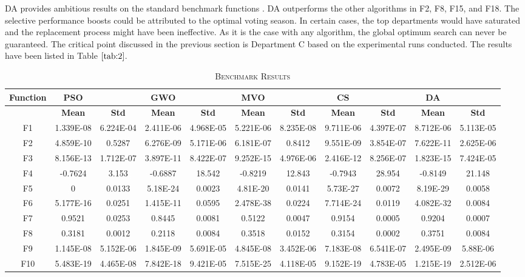 \documentclass[conference]{IEEEtran}
\begin{document}
DA provides ambitious results on the standard benchmark functions \cite{bf}. DA outperforms the other algorithms in F2, F8, F15, and F18. The selective performance boosts could be attributed to the optimal voting season. In certain cases, the top departments would have saturated and the replacement process might have been ineffective. As it is the case with any algorithm, the global optimum search can never be guaranteed. The critical point discussed in the previous section is Department C based on the experimental runs conducted. The results have been listed in Table $\ref{tab:2}$.

\begin{table}
\scriptsize
\caption{\textsc{Benchmark Results}}
\label{tab:2}
\centering
{
\begin{tabular}{| c | c  c | c  c | c  c | c  c | c  c |}
\hline
{\textbf{Function}}&{\textbf{PSO}}&{}&{\textbf{GWO}}&{}&{\textbf{MVO}}&{}&{\textbf{CS}}&{}&{\textbf{DA}}&{}\\
\hline
{}&{\textbf{Mean}}&{\textbf{Std}}&{\textbf{Mean}}&{\textbf{Std}}&{\textbf{Mean}}&{\textbf{Std}}&{\textbf{Mean}}&{\textbf{Std}}&{\textbf{Mean}}&{\textbf{Std}}\\
\hline
{F1}&{1.339E-08}&{6.224E-04}&{2.411E-06}&{4.968E-05}&{5.221E-06}&{8.235E-08}&{9.711E-06}&{4.397E-07}&{8.712E-06}&{5.113E-05}\\
{F2}&{4.859E-10}&{0.5287}&{6.276E-09}&{5.171E-06}&{6.181E-07}&{0.8412}&{9.551E-09}&{3.854E-07}&{7.622E-11}&{2.625E-06}\\
{F3}&{8.156E-13}&{1.712E-07}&{3.897E-11}&{8.422E-07}&{9.252E-15}&{4.976E-06}&{2.416E-12}&{8.256E-07}&{1.823E-15}&{7.424E-05}\\
{F4}&{-0.7624}&{3.153}&{-0.6887}&{18.542}&{-0.8219}&{12.843}&{-0.7943}&{28.954}&{-0.8149}&{21.148}\\
{F5}&{0}&{0.0133}&{5.18E-24}&{0.0023}&{4.81E-20}&{0.0141}&{5.73E-27}&{0.0072}&{8.19E-29}&{0.0058}\\
{F6}&{5.177E-16}&{0.0251}&{1.415E-11}&{0.0595}&{2.478E-38}&{0.0224}&{7.714E-24}&{0.0119}&{4.082E-32}&{0.0084}\\
{F7}&{0.9521}&{0.0253}&{0.8445}&{0.0081}&{0.5122}&{0.0047}&{0.9154}&{0.0005}&{0.9204}&{0.0007}\\
{F8}&{0.3181}&{0.0012}&{0.2118}&{0.0084}&{0.3518}&{0.0152}&{0.3154}&{0.0002}&{0.3751}&{0.0084}\\
{F9}&{1.145E-08}&{5.152E-06}&{1.845E-09}&{5.691E-05}&{4.845E-08}&{3.452E-06}&{7.183E-08}&{6.541E-07}&{2.495E-09}&{5.88E-06}\\
{F10}&{5.483E-19}&{4.465E-08}&{7.842E-18}&{9.421E-05}&{7.515E-25}&{4.118E-05}&{9.152E-19}&{4.783E-05}&{1.215E-19}&{2.512E-06}\\

\end{tabular}}
\end{table}
\end{document}
